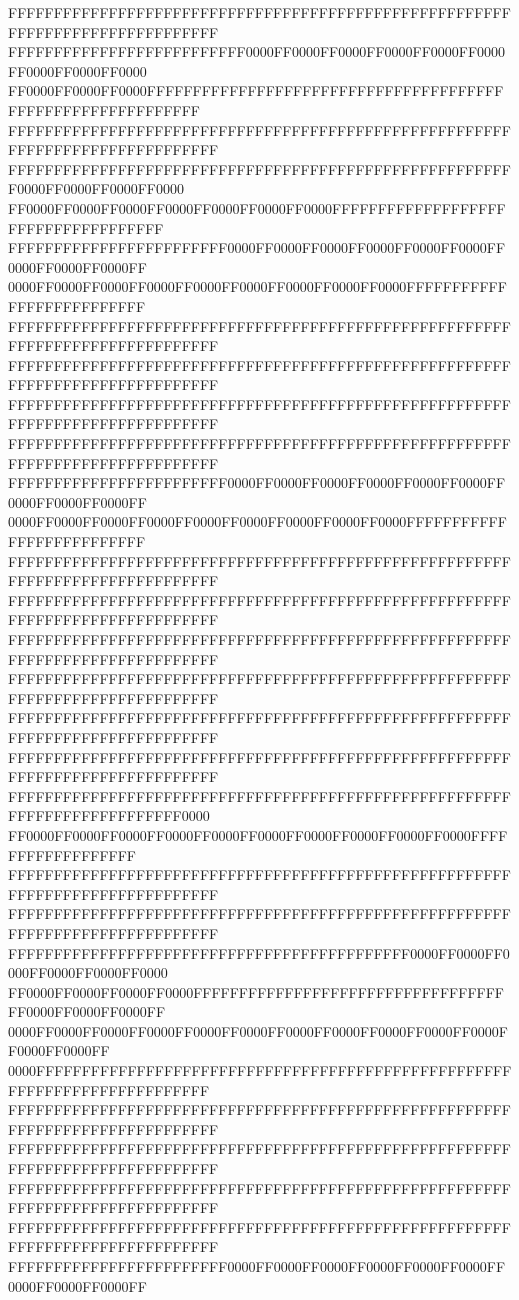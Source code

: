 FFFFFFFFFFFFFFFFFFFFFFFFFFFFFFFFFFFFFFFFFFFFFFFFFFFFFFFFFFFFFFFFFFFFFFFFFFFFFF
FFFFFFFFFFFFFFFFFFFFFFFFFF0000FF0000FF0000FF0000FF0000FF0000FF0000FF0000FF0000
FF0000FF0000FF0000FFFFFFFFFFFFFFFFFFFFFFFFFFFFFFFFFFFFFFFFFFFFFFFFFFFFFFFFFFFF
FFFFFFFFFFFFFFFFFFFFFFFFFFFFFFFFFFFFFFFFFFFFFFFFFFFFFFFFFFFFFFFFFFFFFFFFFFFFFF
FFFFFFFFFFFFFFFFFFFFFFFFFFFFFFFFFFFFFFFFFFFFFFFFFFFFFFFF0000FF0000FF0000FF0000
FF0000FF0000FF0000FF0000FF0000FF0000FF0000FFFFFFFFFFFFFFFFFFFFFFFFFFFFFFFFFFFF
FFFFFFFFFFFFFFFFFFFFFFFF0000FF0000FF0000FF0000FF0000FF0000FF0000FF0000FF0000FF
0000FF0000FF0000FF0000FF0000FF0000FF0000FF0000FF0000FFFFFFFFFFFFFFFFFFFFFFFFFF
FFFFFFFFFFFFFFFFFFFFFFFFFFFFFFFFFFFFFFFFFFFFFFFFFFFFFFFFFFFFFFFFFFFFFFFFFFFFFF
FFFFFFFFFFFFFFFFFFFFFFFFFFFFFFFFFFFFFFFFFFFFFFFFFFFFFFFFFFFFFFFFFFFFFFFFFFFFFF
FFFFFFFFFFFFFFFFFFFFFFFFFFFFFFFFFFFFFFFFFFFFFFFFFFFFFFFFFFFFFFFFFFFFFFFFFFFFFF
FFFFFFFFFFFFFFFFFFFFFFFFFFFFFFFFFFFFFFFFFFFFFFFFFFFFFFFFFFFFFFFFFFFFFFFFFFFFFF
FFFFFFFFFFFFFFFFFFFFFFFF0000FF0000FF0000FF0000FF0000FF0000FF0000FF0000FF0000FF
0000FF0000FF0000FF0000FF0000FF0000FF0000FF0000FF0000FFFFFFFFFFFFFFFFFFFFFFFFFF
FFFFFFFFFFFFFFFFFFFFFFFFFFFFFFFFFFFFFFFFFFFFFFFFFFFFFFFFFFFFFFFFFFFFFFFFFFFFFF
FFFFFFFFFFFFFFFFFFFFFFFFFFFFFFFFFFFFFFFFFFFFFFFFFFFFFFFFFFFFFFFFFFFFFFFFFFFFFF
FFFFFFFFFFFFFFFFFFFFFFFFFFFFFFFFFFFFFFFFFFFFFFFFFFFFFFFFFFFFFFFFFFFFFFFFFFFFFF
FFFFFFFFFFFFFFFFFFFFFFFFFFFFFFFFFFFFFFFFFFFFFFFFFFFFFFFFFFFFFFFFFFFFFFFFFFFFFF
FFFFFFFFFFFFFFFFFFFFFFFFFFFFFFFFFFFFFFFFFFFFFFFFFFFFFFFFFFFFFFFFFFFFFFFFFFFFFF
FFFFFFFFFFFFFFFFFFFFFFFFFFFFFFFFFFFFFFFFFFFFFFFFFFFFFFFFFFFFFFFFFFFFFFFFFFFFFF
FFFFFFFFFFFFFFFFFFFFFFFFFFFFFFFFFFFFFFFFFFFFFFFFFFFFFFFFFFFFFFFFFFFFFFFFFF0000
FF0000FF0000FF0000FF0000FF0000FF0000FF0000FF0000FF0000FF0000FFFFFFFFFFFFFFFFFF
FFFFFFFFFFFFFFFFFFFFFFFFFFFFFFFFFFFFFFFFFFFFFFFFFFFFFFFFFFFFFFFFFFFFFFFFFFFFFF
FFFFFFFFFFFFFFFFFFFFFFFFFFFFFFFFFFFFFFFFFFFFFFFFFFFFFFFFFFFFFFFFFFFFFFFFFFFFFF
FFFFFFFFFFFFFFFFFFFFFFFFFFFFFFFFFFFFFFFFFFFF0000FF0000FF0000FF0000FF0000FF0000
FF0000FF0000FF0000FF0000FFFFFFFFFFFFFFFFFFFFFFFFFFFFFFFFFFFF0000FF0000FF0000FF
0000FF0000FF0000FF0000FF0000FF0000FF0000FF0000FF0000FF0000FF0000FF0000FF0000FF
0000FFFFFFFFFFFFFFFFFFFFFFFFFFFFFFFFFFFFFFFFFFFFFFFFFFFFFFFFFFFFFFFFFFFFFFFFFF
FFFFFFFFFFFFFFFFFFFFFFFFFFFFFFFFFFFFFFFFFFFFFFFFFFFFFFFFFFFFFFFFFFFFFFFFFFFFFF
FFFFFFFFFFFFFFFFFFFFFFFFFFFFFFFFFFFFFFFFFFFFFFFFFFFFFFFFFFFFFFFFFFFFFFFFFFFFFF
FFFFFFFFFFFFFFFFFFFFFFFFFFFFFFFFFFFFFFFFFFFFFFFFFFFFFFFFFFFFFFFFFFFFFFFFFFFFFF
FFFFFFFFFFFFFFFFFFFFFFFFFFFFFFFFFFFFFFFFFFFFFFFFFFFFFFFFFFFFFFFFFFFFFFFFFFFFFF
FFFFFFFFFFFFFFFFFFFFFFFF0000FF0000FF0000FF0000FF0000FF0000FF0000FF0000FF0000FF
